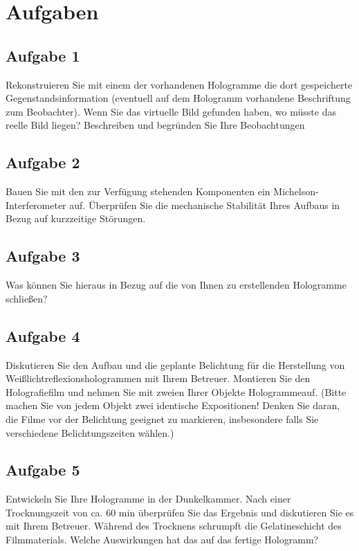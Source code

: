 \section{Aufgaben}

\subsection*{Aufgabe 1}
Rekonstruieren Sie mit einem der vorhandenen Hologramme die dort gespeicherte Gegenstandsinformation (eventuell auf dem Hologramm vorhandene Beschriftung zum Beobachter). Wenn Sie das virtuelle Bild gefunden haben, wo müsste das reelle Bild liegen? Beschreiben und begründen Sie Ihre Beobachtungen

\subsection*{Aufgabe 2}
Bauen Sie mit den zur Verfügung stehenden Komponenten ein Michelson-Interferometer auf. Überprüfen Sie die mechanische Stabilität Ihres Aufbaus in Bezug auf kurzzeitige Störungen. 

\subsection*{Aufgabe 3}
Was können Sie hieraus in Bezug auf die von Ihnen zu erstellenden Hologramme schließen? 

\subsection*{Aufgabe 4}
Diskutieren Sie den Aufbau und die geplante Belichtung für die Herstellung von Weißlichtreflexionshologrammen mit Ihrem Betreuer. Montieren Sie den Holografiefilm und nehmen Sie mit zweien Ihrer Objekte Hologrammeauf. (Bitte machen Sie von jedem Objekt zwei identische Expositionen! Denken Sie daran, die Filme vor der 
Belichtung geeignet zu markieren, insbesondere falls Sie verschiedene Belichtungszeiten wählen.) 

\subsection*{Aufgabe 5}
Entwickeln Sie Ihre Hologramme in der Dunkelkammer. Nach einer Trocknungszeit von  ca. 60 min überprüfen Sie das Ergebnis und diskutieren Sie es mit Ihrem Betreuer. Während des Trocknens schrumpft die Gelatineschicht des Filmmaterials. Welche Auswirkungen hat das auf das fertige Hologramm?

